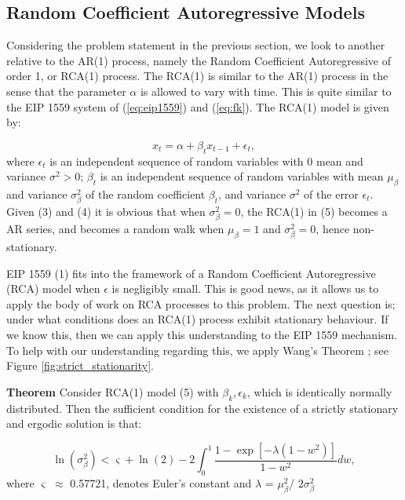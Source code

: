\documentclass{article}
\begin{document}
\subsection{Random Coefficient Autoregressive Models}
\label{section:rca}

Considering the problem statement in the previous section, we look to another relative to the AR(1) process, namely the Random Coefficient Autoregressive of order 1, or RCA(1) process. The RCA(1) is similar to the AR(1) process in the sense that the parameter $\alpha$ is allowed to vary with time. This is quite similar to the EIP 1559 system of (\ref{eq:eip1559}) and (\ref{eq:fk}). The RCA(1) model is given by:

\begin{equation}
x_{t} = \alpha + \beta_{t}x_{t-1} + \epsilon_{t},
\label{eq:rca1}
\end{equation}
where ${\epsilon_{t}}$ is an independent sequence of random variables with 0 mean and variance $\sigma^2 > 0$; ${\beta_{t}}$ is an independent sequence of random variables with mean $\mu_{\beta}$ and variance $\sigma_{\beta}^2$ of the random coefficient $\beta_{t}$, and variance $\sigma^2$ of the error $\epsilon_{t}$. Given (3) and (4) it is obvious that when $\sigma_{\beta}^2 = 0$, the RCA(1) in (5) becomes a AR series, and becomes a random walk when $\mu_{\beta} = 1$ and $\sigma_{\beta}^2 = 0$, hence non-stationary. 

EIP 1559 (1) fits into the framework of a Random Coefficient Autoregressive (RCA) model when $\epsilon$ is negligibly small. This is good news, as it allows us to apply the body of work on RCA processes to this problem. The next question is; under what conditions does an RCA(1) process exhibit stationary behaviour. If we know this, then we can apply this understanding to the EIP 1559 mechanism. To help with our understanding regarding this, we apply Wang's Theorem \cite{Wan03}; see Figure \ref{fig:strict_stationarity}.

\textbf{Theorem} Consider RCA(1) model (5) with ${\beta_{k},\epsilon_{k}}$, which is identically normally distributed.  Then the sufficient condition for the existence of a strictly stationary and ergodic solution is that:

\begin{equation}
\ln(\sigma_{\beta}^2) < \varsigma + \ln(2) - 2 \int_{0}^{1}\frac{1 - \exp[-\lambda(1-w^2)]}{1-w^2}dw,
\label{eq:thm} 
\end{equation}
where $\varsigma$ $\approx$ 0.57721, denotes Euler’s constant and $\lambda$ = $\mu_{\beta}^2$/ $2\sigma_{\beta}^2$
\end{document}
